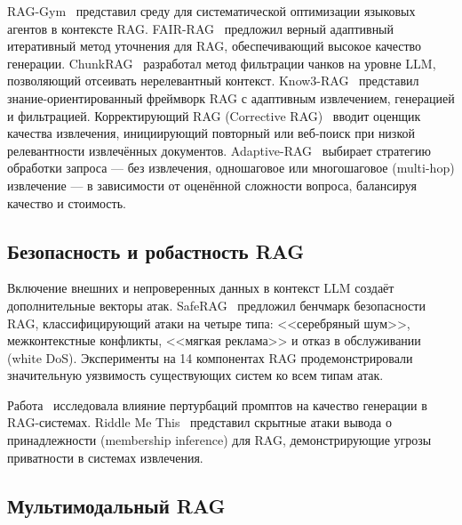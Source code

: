 RAG-Gym~\cite{2502.13957} представил среду для систематической оптимизации языковых агентов в контексте RAG. FAIR-RAG~\cite{2510.22344} предложил верный адаптивный итеративный метод уточнения для RAG, обеспечивающий высокое качество генерации. ChunkRAG~\cite{2410.19572} разработал метод фильтрации чанков на уровне LLM, позволяющий отсеивать нерелевантный контекст. Know3-RAG~\cite{2505.12662} представил знание-ориентированный фреймворк RAG с адаптивным извлечением, генерацией и фильтрацией. Корректирующий RAG (Corrective RAG)~\cite{2401.15884} вводит оценщик качества извлечения, инициирующий повторный или веб-поиск при низкой релевантности извлечённых документов. Adaptive-RAG~\cite{2403.14403} выбирает стратегию обработки запроса --- без извлечения, одношаговое или многошаговое (multi-hop) извлечение --- в зависимости от оценённой сложности вопроса, балансируя качество и стоимость.

\subsection{Безопасность и робастность RAG}\label{subsec:rag_security}

Включение внешних и непроверенных данных в контекст LLM создаёт дополнительные векторы атак. SafeRAG~\cite{2501.18636} предложил бенчмарк безопасности RAG, классифицирующий атаки на четыре типа: <<серебряный шум>>, межконтекстные конфликты, <<мягкая реклама>> и отказ в обслуживании (white DoS). Эксперименты на 14 компонентах RAG продемонстрировали значительную уязвимость существующих систем ко всем типам атак.

Работа~\cite{2402.07179} исследовала влияние пертурбаций промптов на качество генерации в RAG-системах. Riddle Me This~\cite{2502.00306} представил скрытные атаки вывода о принадлежности (membership inference) для RAG, демонстрирующие угрозы приватности в системах извлечения.

\subsection{Мультимодальный RAG}\label{subsec:multimodal_rag}

